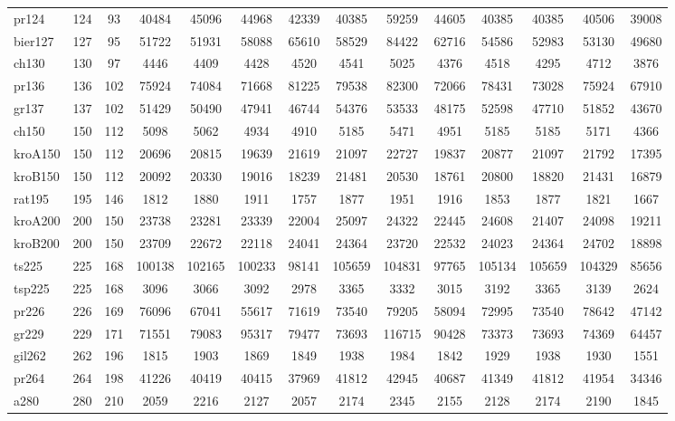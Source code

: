 \begin{table}[htbp]
{{\begin{tabular}{|l|c|c|c|c|c|c|c|c|c|c|c|c|c|}
pr124 & 124 & 93 & 40484 & 45096 & 44968 & 42339 & 40385 & 59259 & 44605 & 40385 & 40385 & 40506 & 39008 \\
bier127 & 127 & 95 & 51722 & 51931 & 58088 & 65610 & 58529 & 84422 & 62716 & 54586 & 52983 & 53130 & 49680 \\
ch130 & 130 & 97 & 4446 & 4409 & 4428 & 4520 & 4541 & 5025 & 4376 & 4518 & 4295 & 4712 & 3876 \\
pr136 & 136 & 102 & 75924 & 74084 & 71668 & 81225 & 79538 & 82300 & 72066 & 78431 & 73028 & 75924 & 67910 \\
gr137 & 137 & 102 & 51429 & 50490 & 47941 & 46744 & 54376 & 53533 & 48175 & 52598 & 47710 & 51852 & 43670 \\
ch150 & 150 & 112 & 5098 & 5062 & 4934 & 4910 & 5185 & 5471 & 4951 & 5185 & 5185 & 5171 & 4366 \\
kroA150 & 150 & 112 & 20696 & 20815 & 19639 & 21619 & 21097 & 22727 & 19837 & 20877 & 21097 & 21792 & 17395 \\
kroB150 & 150 & 112 & 20092 & 20330 & 19016 & 18239 & 21481 & 20530 & 18761 & 20800 & 18820 & 21431 & 16879 \\
rat195 & 195 & 146 & 1812 & 1880 & 1911 & 1757 & 1877 & 1951 & 1916 & 1853 & 1877 & 1821 & 1667 \\
kroA200 & 200 & 150 & 23738 & 23281 & 23339 & 22004 & 25097 & 24322 & 22445 & 24608 & 21407 & 24098 & 19211 \\
kroB200 & 200 & 150 & 23709 & 22672 & 22118 & 24041 & 24364 & 23720 & 22532 & 24023 & 24364 & 24702 & 18898 \\
ts225 & 225 & 168 & 100138 & 102165 & 100233 & 98141 & 105659 & 104831 & 97765 & 105134 & 105659 & 104329 & 85656 \\
tsp225 & 225 & 168 & 3096 & 3066 & 3092 & 2978 & 3365 & 3332 & 3015 & 3192 & 3365 & 3139 & 2624 \\
pr226 & 226 & 169 & 76096 & 67041 & 55617 & 71619 & 73540 & 79205 & 58094 & 72995 & 73540 & 78642 & 47142 \\
gr229 & 229 & 171 & 71551 & 79083 & 95317 & 79477 & 73693 & 116715 & 90428 & 73373 & 73693 & 74369 & 64457 \\
gil262 & 262 & 196 & 1815 & 1903 & 1869 & 1849 & 1938 & 1984 & 1842 & 1929 & 1938 & 1930 & 1551 \\
pr264 & 264 & 198 & 41226 & 40419 & 40415 & 37969 & 41812 & 42945 & 40687 & 41349 & 41812 & 41954 & 34346 \\
a280 & 280 & 210 & 2059 & 2216 & 2127 & 2057 & 2174 & 2345 & 2155 & 2128 & 2174 & 2190 & 1845 \\

\end{tabular}}}
\end{table}
